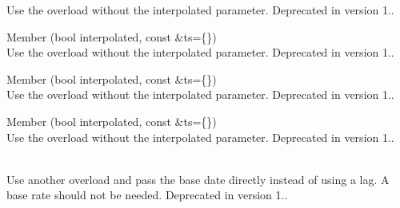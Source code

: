 \begin{DoxyRefList}
\label{deprecated__deprecated000024}%
%
Use the overload without the interpolated parameter. Deprecated in version 1..  
\item[Member \doxylink{class_quant_lib_1_1_y_y_u_k_r_p_i_a3a04754decec587c5c373c36ad79280d}{Quant\+Lib\+::YYUKRPI\+::YYUKRPI} (bool interpolated, const \doxylink{class_quant_lib_1_1_handle}{Handle$<$ Yo\+YInflation\+Term\+Structure $>$} \&ts=\{\})]\hfill \\
\label{deprecated__deprecated000096}%
%
Use the overload without the interpolated parameter. Deprecated in version 1..  
\item[Member \doxylink{class_quant_lib_1_1_y_y_u_s_c_p_i_a4a04a3fa6faf7c5ce95c335923588ab2}{Quant\+Lib\+::YYUSCPI\+::YYUSCPI} (bool interpolated, const \doxylink{class_quant_lib_1_1_handle}{Handle$<$ Yo\+YInflation\+Term\+Structure $>$} \&ts=\{\})]\hfill \\
\label{deprecated__deprecated000097}%
%
Use the overload without the interpolated parameter. Deprecated in version 1..  
\item[Member \doxylink{class_quant_lib_1_1_y_y_z_a_c_p_i_afd43796e6204d767a2c13140ccb81759}{Quant\+Lib\+::YYZACPI\+::YYZACPI} (bool interpolated, const \doxylink{class_quant_lib_1_1_handle}{Handle$<$ Yo\+YInflation\+Term\+Structure $>$} \&ts=\{\})]\hfill \\
\label{deprecated__deprecated000098}%
%
Use the overload without the interpolated parameter. Deprecated in version 1..  
\item[Member \doxylink{class_quant_lib_1_1_zero_inflation_term_structure_a911d1c1a212d0af516586dc7bf6ffa95}{Quant\+Lib\+::Zero\+Inflation\+Term\+Structure\+::Zero\+Inflation\+Term\+Structure} (const \doxylink{class_quant_lib_1_1_day_counter}{Day\+Counter} \&day\+Counter, \doxylink{namespace_quant_lib_a919ba3567cc89fca373f8d6b8e80126b}{Rate} base\+Zero\+Rate, const \doxylink{class_quant_lib_1_1_period}{Period} \&lag, \doxylink{namespace_quant_lib_abfa020992bcf412e2bc99f56d4381b4a}{Frequency} frequency, const ext\+::shared\+\_\+ptr$<$ Seasonality $>$ \&seasonality=\{\})]\hfill \\
\label{deprecated__deprecated000137}%
%
Use another overload and pass the base date directly instead of using a lag. A base rate should not be needed. Deprecated in version 1..  

\end{DoxyRefList}
